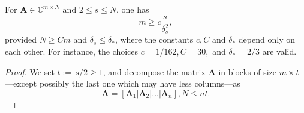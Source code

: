 \begin{theorem}
    \label{th2.8}
    For $\mathbf{A} \in \mathbb{C}^{m \times N}$ and $2 \leq s \leq N$, one has
    \begin{equation}
        m \geq c \dfrac{s}{\delta_s^2},
        \label{eq2.9}
    \end{equation}
    provided $N \geq Cm$ and $\delta_s \leq \delta_*$, where the constants $c, C$ and $\delta_*$ depend only on each other. For instance, the choices $c = 1/162, C = 30,$ and $\delta_* = 2/3$ are valid.
\end{theorem}

\begin{proof}
    We set $t := \,s/2\! \geq 1$, and decompose the matrix $\mathbf{A}$ in blocks of size $m \times t$---except possibly the last one which may have less columns---as
    \[
        \mathbf{A} = \left[ \mathbf{A}_1 | \mathbf{A}_2 | \dots| \mathbf{A}_n \right], N \leq nt.
    \]


\end{proof}
